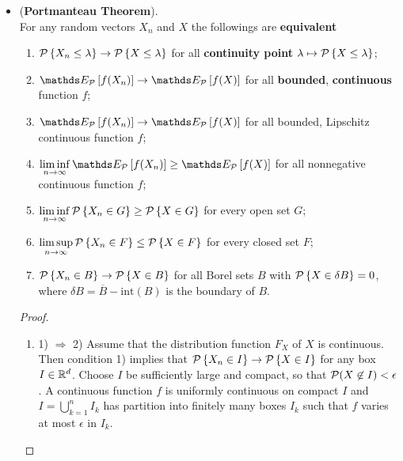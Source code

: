 \documentclass[11pt]{article}
\begin{document}
\begin{itemize}
\item \begin{theorem} (\textbf{Portmanteau Theorem}). \citep{van2000asymptotic}\\
For any random vectors $X_{n}$ and $X$ the followings are \textbf{equivalent}
\begin{enumerate}
\item ${\mathcal P}\left\{X_{n}\le \lambda\right\} \rightarrow {\mathcal P}\left\{X\le \lambda\right\}$ for all \textbf{continuity point} $\lambda \mapsto {\mathcal P}\left\{X\le \lambda\right\}$;
\item $\E{\cP}{f(X_{n})} \rightarrow \E{\cP}{f(X)} $ for all \textbf{bounded}, \textbf{continuous} function $f$;
\item $\E{\cP}{f(X_{n})} \rightarrow \E{\cP}{f(X)} $ for all bounded, Lipschitz continuous function $f$;
\item $\liminf\limits_{n\rightarrow \infty}\E{\cP}{f(X_{n})}  \ge \E{\cP}{f(X)}$ for all nonnegative continuous function $f$;
\item $\liminf\limits_{n\rightarrow \infty}{\mathcal P}\left\{X_{n}\in G\right\}  \ge {\mathcal P}\left\{X\in G\right\} $ for every open set $G$;
\item $\limsup\limits_{n\rightarrow \infty}{\mathcal P}\left\{X_{n}\in F\right\}  \le {\mathcal P}\left\{X\in F\right\} $ for every closed set $F$;
\item ${\mathcal P}\left\{X_{n} \in B\right\} \rightarrow {\mathcal P}\left\{X \in B\right\}$ for all Borel sets $B$ with ${\mathcal P}\left\{X\in \delta B\right\}= 0$, where $\delta B  = \overline{B}- \text{int}(B)$ is the boundary of $B$.
\end{enumerate} 
\end{theorem}
\begin{proof}
\begin{enumerate}
\item 1) $\Rightarrow$ 2) Assume that the distribution function $F_{X}$ of $X$ is continuous. Then condition 1) implies that  
${\mathcal P}\left\{X_{n}\in I\right\} \rightarrow {\mathcal P}\left\{X\in I\right\}  $ for any box $I\in {\mathbb R}^{d}$. Choose  $I$ be sufficiently large and compact, so that ${\mathcal P}(X\not\in I)<\epsilon$. A continuous function $f$ is uniformly continuous on compact $I$ and $I = \bigcup_{k=1}^{n}I_{k}$ has partition into finitely many boxes $I_{k}$ such that $f$ varies at most $\epsilon$ in $I_{k}$. 


\end{enumerate}
\end{proof}
\end{itemize}
\end{document}
